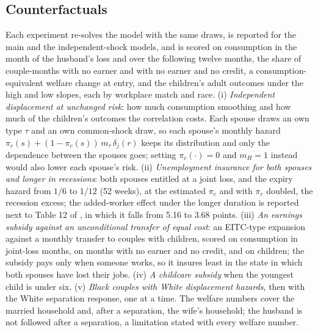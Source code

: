 \subsection{Counterfactuals}

Each experiment re-solves the model with the same draws, is reported for the main and the independent-shock models,
and is scored on consumption in the month of the husband's loss and over the following twelve months, the share of
couple-months with no earner and with no earner and no credit, a consumption-equivalent welfare change at entry, and
the children's adult outcomes under the high and low slopes, each by workplace match and race. (i) \emph{Independent
displacement at unchanged risk}: how much consumption smoothing and how much of the children's outcomes the correlation
costs. Each spouse draws an own type $\tau$ and an own common-shock draw, so each spouse's monthly hazard
$\pi_c(s) + (1 - \pi_c(s))\,m_\tau\,\delta_j(r)$ keeps its distribution and only the dependence between the spouses
goes; setting $\pi_c(\cdot) = 0$ and $m_H = 1$ instead would also lower each spouse's risk.
(ii) \emph{Unemployment insurance for both spouses and longer in recessions}: both spouses entitled at a joint loss,
and the expiry hazard from $1/6$ to $1/12$ (52 weeks), at the estimated $\pi_c$ and with $\pi_c$ doubled, the
recession excess; the added-worker effect under the longer duration is reported next to Table 12 of
\citet{bacher2025joint}, in which it falls from 5.16 to 3.68 points. (iii) \emph{An earnings subsidy against an
unconditional transfer of equal cost}: an EITC-type expansion against a monthly transfer to couples with children,
scored on consumption in joint-loss months, on months with no earner and no credit, and on children; the subsidy pays
only when someone works, so it insures least in the state in which both spouses have lost their jobs. (iv) \emph{A
childcare subsidy} when the youngest child is under six. (v) \emph{Black couples with White displacement hazards},
then with the White separation response, one at a time. The welfare numbers cover the married household and, after a
separation, the wife's household; the husband is not followed after a separation, a limitation stated with every
welfare number.
